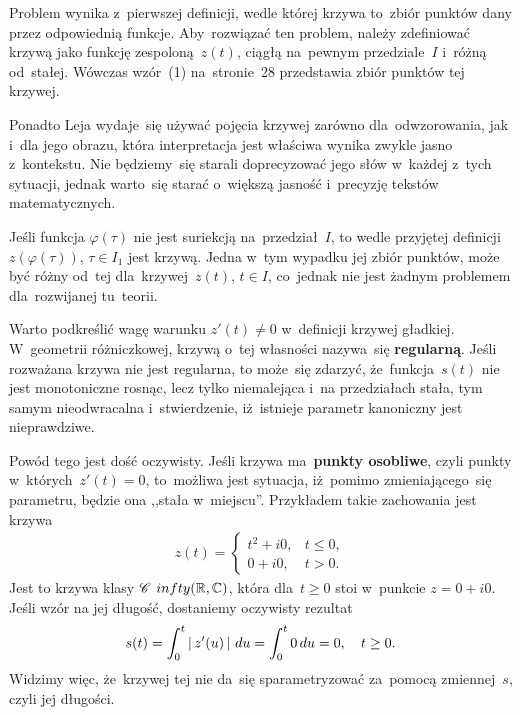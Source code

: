 \documentclass[a4paper,11pt]{article}
\begin{document}
Problem wynika z~pierwszej definicji, wedle której krzywa to~zbiór
punktów dany przez odpowiednią funkcje. Aby~rozwiązać ten problem,
należy zdefiniować krzywą jako funkcję zespoloną~$z( t )$, ciągłą
na~pewnym przedziale~$I$ i~różną od~stałej. Wówczas wzór~(1)
na~stronie~28 przedstawia zbiór punktów tej krzywej.

Ponadto Leja wydaje~się używać pojęcia krzywej zarówno
dla~odwzorowania, jak i~dla jego obrazu, która interpretacja jest
właściwa wynika zwykle jasno z~kontekstu. Nie będziemy~się starali
doprecyzować jego słów w~każdej z~tych sytuacji, jednak warto~się
starać o~większą jasność i~precyzję tekstów matematycznych.

\vspace{\spaceFour}


\start {} Jeśli funkcja $\varphi( \tau )$ nie jest suriekcją
na~przedział~$I$, to wedle przyjętej definicji~$z( \varphi( \tau ) )$,
$\tau \in I_{ 1 }$ jest krzywą. Jedna w~tym wypadku jej zbiór punktów,
może być różny od~tej dla~krzywej~$z( t )$, $t \in I$, co~jednak nie
jest żadnym problemem dla~rozwijanej tu~teorii.

\vspace{\spaceFour}


\start {} Warto podkreślić wagę warunku $z'( t ) \neq 0$
w~definicji krzywej gładkiej. W~geometrii różniczkowej, krzywą o~tej
własności nazywa~się \textbf{regularną}. Jeśli rozważana krzywa nie
jest regularna, to może~się zdarzyć, że~funkcja~$s( t )$ nie jest
monotoniczne rosnąc, lecz tylko niemalejąca i~na przedziałach stała,
tym samym nieodwracalna i~stwierdzenie, iż~istnieje parametr
kanoniczny jest nieprawdziwe.

Powód tego jest dość oczywisty. Jeśli krzywa ma~\textbf{punkty
  osobliwe}, czyli punkty w~których~$z'( t ) = 0$, to~możliwa jest
sytuacja, iż~pomimo zmieniającego~się parametru, będzie ona ,,stała
w~miejscu''. Przykładem takie zachowania jest krzywa
\begin{equation}
  \label{eq:Leja-30}
  \begin{split}
    z( t ) =
    \begin{cases}
      t^{ 2 } + i 0, & t \leq 0, \\
      0 + i 0, & t > 0.
    \end{cases}
  \end{split}
\end{equation}
Jest to krzywa klasy $\mathcal{C}^{ \ }infty( \mathbb{R}, \mathbb{C} )$, która dla~$t \geq 0$ stoi
w~punkcie $z = 0 + i 0$. Jeśli wzór na jej długość, dostaniemy
oczywisty rezultat
\begin{equation}
  \label{eq:Leja-31}
  \begin{split}
    s( t ) = \int_{ 0 }^{ t } \left| \,  z'( u )  \, \right| \, du = \int_{ 0 }^{ t } 0 \, du = 0, \quad t \geq 0.
  \end{split}
\end{equation}
Widzimy więc, że~krzywej tej nie da~się sparametryzować za~pomocą
zmiennej~$s$, czyli jej długości.
\end{document}
